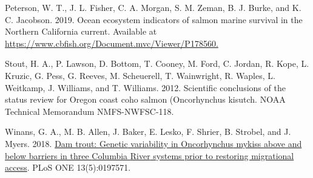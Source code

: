 \documentclass[
  letterpaper,
  oneside,
  open=any]{scrbook}
\newlength{\cslhangindent}
\newlength{\cslentryspacingunit} %
\newenvironment{CSLReferences}[2] %
 {%
  \setlength{\parindent}{0pt}
  \ifodd #1
  \let\oldpar\par
  \def\par{\hangindent=\cslhangindent\oldpar}
  \fi
  \setlength{\parskip}{#2\cslentryspacingunit}
 }%
 {}
\begin{document}
\begin{CSLReferences}{1}{0}
\leavevmode{}%
Peterson, W. T., J. L. Fisher, C. A. Morgan, S. M. Zeman, B. J. Burke,
and K. C. Jacobson. 2019. Ocean ecosystem indicators of salmon marine
survival in the {Northern} {California} current. Available at
\url{https://www.cbfish.org/Document.mvc/Viewer/P178560.}

\leavevmode{}%
Stout, H. A., P. Lawson, D. Bottom, T. Cooney, M. Ford, C. Jordan, R.
Kope, L. Kruzic, G. Pess, G. Reeves, M. Scheuerell, T. Wainwright, R.
Waples, L. Weitkamp, J. Williams, and T. Williams. 2012. Scientific
conclusions of the status review for {Oregon} coast coho salmon
({Oncorhynchus} kisutch. NOAA Technical Memorandum NMFS-NWFSC-118.

\leavevmode{}%
Winans, G. A., M. B. Allen, J. Baker, E. Lesko, F. Shrier, B. Strobel,
and J. Myers. 2018.
\href{https://doi.org/10.1371/journal.pone.0197571.}{Dam trout:
{Genetic} variability in {Oncorhynchus} mykiss above and below barriers
in three {Columbia} {River} systems prior to restoring migrational
access}. PLoS ONE 13(5):0197571.

\end{CSLReferences}


\backmatter
\end{document}
